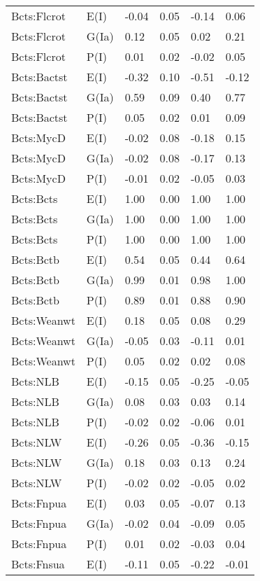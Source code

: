 \begin{center}
\begin{longtable}{|p{1.1in}|p{0.7in}|p{0.7in}|p{0.6in}|p{0.6in}|p{0.6in}|}
  Bcts:Flcrot & E(I) & -0.04 & 0.05 & -0.14 & 0.06 \\ 
  Bcts:Flcrot & G(Ia) & 0.12 & 0.05 & 0.02 & 0.21 \\ 
  Bcts:Flcrot & P(I) & 0.01 & 0.02 & -0.02 & 0.05 \\ 
  Bcts:Bactst & E(I) & -0.32 & 0.10 & -0.51 & -0.12 \\ 
  Bcts:Bactst & G(Ia) & 0.59 & 0.09 & 0.40 & 0.77 \\ 
  Bcts:Bactst & P(I) & 0.05 & 0.02 & 0.01 & 0.09 \\ 
  Bcts:MycD & E(I) & -0.02 & 0.08 & -0.18 & 0.15 \\ 
  Bcts:MycD & G(Ia) & -0.02 & 0.08 & -0.17 & 0.13 \\ 
  Bcts:MycD & P(I) & -0.01 & 0.02 & -0.05 & 0.03 \\ 
  Bcts:Bcts & E(I) & 1.00 & 0.00 & 1.00 & 1.00 \\ 
  Bcts:Bcts & G(Ia) & 1.00 & 0.00 & 1.00 & 1.00 \\ 
  Bcts:Bcts & P(I) & 1.00 & 0.00 & 1.00 & 1.00 \\ 
  Bcts:Bctb & E(I) & 0.54 & 0.05 & 0.44 & 0.64 \\ 
  Bcts:Bctb & G(Ia) & 0.99 & 0.01 & 0.98 & 1.00 \\ 
  Bcts:Bctb & P(I) & 0.89 & 0.01 & 0.88 & 0.90 \\ 
  Bcts:Weanwt & E(I) & 0.18 & 0.05 & 0.08 & 0.29 \\ 
  Bcts:Weanwt & G(Ia) & -0.05 & 0.03 & -0.11 & 0.01 \\ 
  Bcts:Weanwt & P(I) & 0.05 & 0.02 & 0.02 & 0.08 \\ 
  Bcts:NLB & E(I) & -0.15 & 0.05 & -0.25 & -0.05 \\ 
  Bcts:NLB & G(Ia) & 0.08 & 0.03 & 0.03 & 0.14 \\ 
  Bcts:NLB & P(I) & -0.02 & 0.02 & -0.06 & 0.01 \\ 
  Bcts:NLW & E(I) & -0.26 & 0.05 & -0.36 & -0.15 \\ 
  Bcts:NLW & G(Ia) & 0.18 & 0.03 & 0.13 & 0.24 \\ 
  Bcts:NLW & P(I) & -0.02 & 0.02 & -0.05 & 0.02 \\ 
  Bcts:Fnpua & E(I) & 0.03 & 0.05 & -0.07 & 0.13 \\ 
  Bcts:Fnpua & G(Ia) & -0.02 & 0.04 & -0.09 & 0.05 \\ 
  Bcts:Fnpua & P(I) & 0.01 & 0.02 & -0.03 & 0.04 \\ 
  Bcts:Fnsua & E(I) & -0.11 & 0.05 & -0.22 & -0.01 \\ 

\end{longtable}
\end{center}
